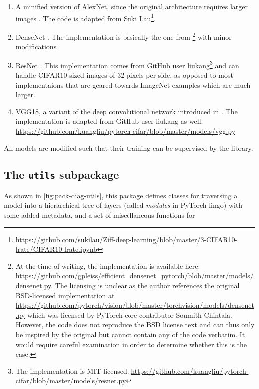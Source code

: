 \begin{enumerate}
    \item
        A minified version of AlexNet, since the original architecture
        requires larger images \citep{krizhevsky2012imagenet}. The
        code is adapted from Suki
        Lau\footnote{\url{https://github.com/sukilau/Ziff-deep-learning/blob/master/3-CIFAR10-lrate/CIFAR10-lrate.ipynb}}.
    \item
        DenseNet \citep{huang2017densely}. The implementation is basically the
        one from \citep{pleiss2017memory}\footnote{At the time of writing, the
            implementation is available here:
            \url{https://github.com/gpleiss/efficient_densenet_pytorch/blob/master/models/densenet.py}.
            The licensing is unclear as the author references the original
            BSD-licensed implementation at
            \url{https://github.com/pytorch/vision/blob/master/torchvision/models/densenet.py}
            which was licensed by PyTorch core contributor Soumith Chintala.
            However, the code does not reproduce the BSD license text and can
            thus only be inspired by the original but cannot contain any of the
        code verbatim. It would require careful examination in order to
    determine whether this is the case.} with minor modifications
    \item
        ResNet \citep{he2016deep}. This implementation comes from
        GitHub user liukang\footnote{The implementation is MIT-licensed.
        \url{https://github.com/kuangliu/pytorch-cifar/blob/master/models/resnet.py}}
        and can handle CIFAR10-sized images of 32 pixels per side, as opposed
        to most implementaions that are geared towards ImageNet examples which
        are much larger.
    \item
        VGG18, a variant of the deep convolutional network introduced in
        \citep{simonyan2014very}. The implementation is adapted from GitHub user
        liukang as well.
        \url{https://github.com/kuangliu/pytorch-cifar/blob/master/models/vgg.py}
\end{enumerate}
All models are modified such that their training can be supervised by
the library.

\hypertarget{sec:pack-utils}{%
\subsection{The \texttt{utils} subpackage}\label{sec:pack-utils}}

As shown in \cref{fig:pack-diag-utils}, this package defines classes for
traversing a model into a hierarchical tree of layers (called \emph{modules} in
PyTorch lingo) with some added metadata, and a set of miscellaneous functions for

